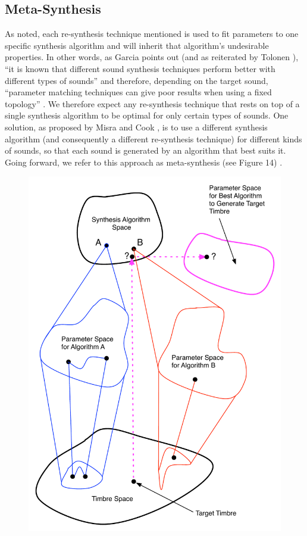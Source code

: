 \documentclass[12pt]{report} 	%
\numberwithin{figure}{chapter}
\numberwithin{table}{chapter}
\numberwithin{equation}{chapter}
\begin{document}
\begin{flushleft}
\section{Meta-Synthesis}

As noted, each re-synthesis technique mentioned is used to fit parameters to one specific synthesis algorithm and will inherit that algorithm's undesirable properties. In other words, as Garcia points out (and as reiterated by Tolonen \cite[p. 103]{Tolonen:1998bh}), ``it is known that different sound synthesis techniques perform better with different types of sounds'' \cite[p. 1]{Garcia:2001jw} and therefore, depending on the target sound, ``parameter matching techniques can give poor results when using a fixed topology'' \cite[p. 1]{Garcia:2000th}. We therefore expect any re-synthesis technique that rests on top of a single synthesis algorithm to be optimal for only certain types of sounds. One solution, as proposed by Misra and Cook \cite{Misra:2009km}, is to use a different synthesis algorithm (and consequently a different re-synthesis technique) for different kinds of sounds, so that each sound is generated by an algorithm that best suits it. Going forward, we refer to this approach as meta-synthesis (see Figure 14) \cite[p. 1]{Misra:2009km}. 
\begin{figure}[h!]
\begin{center}
\includegraphics[scale=0.70]{MetaSynthesis1}

\end{center}
\end{figure}
\end{flushleft}
\end{document}
